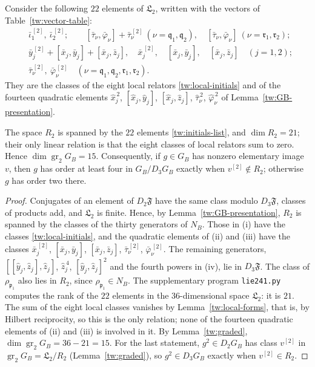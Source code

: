 Consider the following $22$ elements of $\mathfrak L_2$, written with the
vectors of Table~\ref{tw:vector-table}:
\begin{equation}\label{tw:initials-list}
\begin{aligned}
 &\bar\iota_1^{\,[2]},\ \bar\iota_2^{\,[2]};\qquad
 [\bar\tau_\nu,\bar\varphi_\nu]+\bar\tau_\nu^{\,[2]}\ (\nu=\mathfrak q_1,\mathfrak q_2),\quad
 [\bar\tau_\nu,\bar\varphi_\nu]\ (\nu=\mathfrak r_1,\mathfrak r_2);\\
 &\bar y_j^{\,[2]}+[\bar x_j,\bar y_j]+[\bar x_j,\bar z_j],\quad
 \bar x_j^{\,[2]},\quad [\bar x_j,\bar y_j],\quad [\bar x_j,\bar z_j]\quad(j=1,2);\\
 &\bar\tau_\nu^{\,[2]},\ \bar\varphi_\nu^{\,[2]}\quad
 (\nu=\mathfrak q_1,\mathfrak q_2,\mathfrak r_1,\mathfrak r_2).
\end{aligned}
\end{equation}
They are the classes of the eight local relators \eqref{tw:local-initials}
and of the fourteen quadratic elements $\hat x_j^{\,2}$,
$[\hat x_j,\hat y_j]$, $[\hat x_j,\hat z_j]$, $\hat\tau_\nu^{\,2}$,
$\hat\varphi_\nu^{\,2}$ of Lemma~\ref{tw:GB-presentation}.

\begin{lemma}\label{tw:quadratic-layer}
The space $R_2$ is spanned by the $22$ elements \eqref{tw:initials-list}, and
$\dim R_2=21$; their only linear relation is that the eight classes of local
relators sum to zero. Hence $\dim\operatorname{gr}_2G_B=15$. Consequently, if
$g\in G_B$ has nonzero elementary image $v$, then $g$ has order at least four
in $G_B/D_3G_B$ exactly when $v^{[2]}\notin R_2$; otherwise $g$ has order two
there.
\end{lemma}

\begin{proof}
Conjugates of an element of $D_2\mathfrak F$ have the same class modulo
$D_3\mathfrak F$, classes of products add, and $\mathfrak L_2$ is finite.
Hence, by Lemma~\ref{tw:GB-presentation}, $R_2$ is spanned by the classes of
the thirty generators of $N_B$. Those in (i) have the classes
\eqref{tw:local-initials}, and the quadratic elements of (ii) and (iii) have
the classes $\bar x_j^{\,[2]}$, $[\bar x_j,\bar y_j]$, $[\bar x_j,\bar z_j]$,
$\bar\tau_\nu^{\,[2]}$, $\bar\varphi_\nu^{\,[2]}$. The remaining generators,
$[[\hat y_j,\hat z_j],\hat z_j]$, $\hat z_j^{\,4}$, $[\hat y_j,\hat z_j]^2$ and
the fourth powers in (iv), lie in $D_3\mathfrak F$. The class of
$\rho_{\mathfrak p_1}$ also lies in $R_2$, since $\rho_{\mathfrak p_1}\in N_B$.
The supplementary program \texttt{lie241.py} computes the rank of the $22$
elements in the $36$-dimensional space $\mathfrak L_2$: it is $21$. The sum of
the eight local classes vanishes by Lemma~\ref{tw:local-forms}, that is, by
Hilbert reciprocity, so this is the only relation; none of the fourteen
quadratic elements of (ii) and (iii) is involved in it. By
Lemma~\ref{tw:graded}, $\dim\operatorname{gr}_2G_B=36-21=15$. For the last
statement, $g^2\in D_2G_B$ has class $v^{[2]}$ in
$\operatorname{gr}_2G_B=\mathfrak L_2/R_2$ (Lemma~\ref{tw:graded}), so
$g^2\in D_3G_B$ exactly when $v^{[2]}\in R_2$.
\end{proof}

